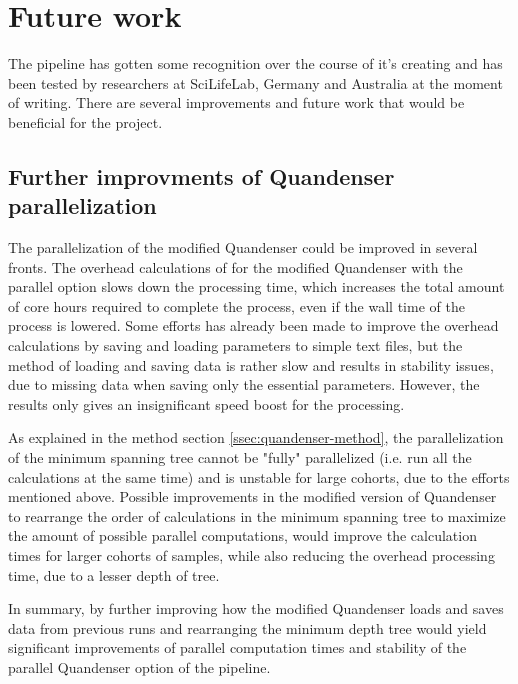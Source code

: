 \section{Future work}

The pipeline has gotten some recognition over the course of it's creating and has been tested by researchers at SciLifeLab, Germany and Australia at the moment of writing. There are several improvements and future work that would be beneficial for the project.

\subsection{Further improvments of Quandenser parallelization}
The parallelization of the modified Quandenser could be improved in several fronts. The overhead calculations of for the modified Quandenser with the parallel option slows down the processing time, which increases the total amount of core hours required to complete the process, even if the wall time of the process is lowered. Some efforts has already been made to improve the overhead calculations by saving and loading parameters to simple text files, but the method of loading and saving data is rather slow and results in stability issues, due to missing data when saving only the essential parameters. However, the results only gives an insignificant speed boost for the processing.

As explained in the method section \ref{ssec:quandenser-method}, the parallelization of the minimum spanning tree cannot be "fully" parallelized (i.e. run all the calculations at the same time) and is unstable for large cohorts, due to the efforts mentioned above. Possible improvements in the modified version of Quandenser to rearrange the order of calculations in the minimum spanning tree to maximize the amount of possible parallel computations, would improve the calculation times for larger cohorts of samples, while also reducing the overhead processing time, due to a lesser depth of tree.

In summary, by further improving how the modified Quandenser loads and saves data from previous runs and rearranging the minimum depth tree would yield significant improvements of parallel computation times and stability of the parallel Quandenser option of the pipeline.

